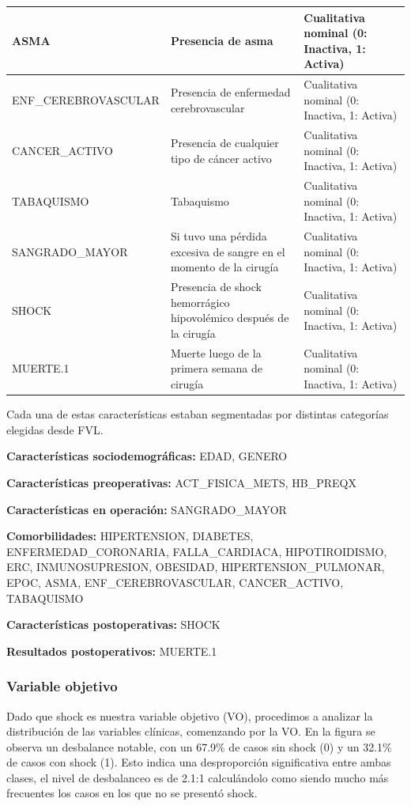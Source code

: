 \documentclass[12pt, letterpaper]{article}
\begin{document}
\begin{center}
\begin{xltabular}{\textwidth}{|>{\raggedright\arraybackslash}p{5cm}|>{\raggedright\arraybackslash}X|>{\raggedright\arraybackslash}p{4cm}|}
ASMA & Presencia de asma & Cualitativa nominal (0: Inactiva, 1: Activa) \\ \hline
ENF\_CEREBROVASCULAR & Presencia de enfermedad cerebrovascular & Cualitativa nominal (0: Inactiva, 1: Activa) \\ \hline
CANCER\_ACTIVO & Presencia de cualquier tipo de cáncer activo & Cualitativa nominal (0: Inactiva, 1: Activa) \\ \hline
TABAQUISMO & Tabaquismo & Cualitativa nominal (0: Inactiva, 1: Activa) \\ \hline
SANGRADO\_MAYOR & Si tuvo una pérdida excesiva de sangre en el momento de la cirugía & Cualitativa nominal (0: Inactiva, 1: Activa) \\ \hline
SHOCK & Presencia de shock hemorrágico hipovolémico después de la cirugía & Cualitativa nominal (0: Inactiva, 1: Activa) \\ \hline
MUERTE.1 & Muerte luego de la primera semana de cirugía & Cualitativa nominal (0: Inactiva, 1: Activa) \\ \hline
\end{xltabular}
\end{center}

Cada una de estas características estaban segmentadas por distintas categorías elegidas desde FVL.

\textbf{Características sociodemográficas:} EDAD, GENERO

\textbf{Características preoperativas:} ACT\_FISICA\_METS, HB\_PREQX

\textbf{Características en operación:} SANGRADO\_MAYOR

\textbf{Comorbilidades:} HIPERTENSION, DIABETES, ENFERMEDAD\_CORONARIA, FALLA\_CARDIACA, HIPOTIROIDISMO, ERC, INMUNOSUPRESION, OBESIDAD, HIPERTENSION\_PULMONAR, EPOC, ASMA, ENF\_CEREBROVASCULAR, CANCER\_ACTIVO, TABAQUISMO

\textbf{Características postoperativas:} SHOCK

\textbf{Resultados postoperativos:} MUERTE.1

\subsubsection{Variable objetivo}

Dado que shock es nuestra variable objetivo (VO), procedimos a analizar la distribución de las variables clínicas, comenzando por la VO. En la figura se observa un desbalance notable, con un 67.9\% de casos sin shock (0) y un 32.1\% de casos con shock (1). Esto indica una desproporción significativa entre ambas clases, el nivel de desbalanceo es de 2.1:1 calculándolo como siendo mucho más frecuentes los casos en los que no se presentó shock.
\end{document}
